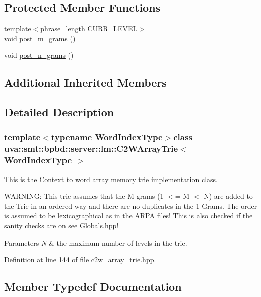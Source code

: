 \subsection*{Protected Member Functions}
\begin{DoxyCompactItemize}
\item 
{\footnotesize template$<$phrase\+\_\+length C\+U\+R\+R\+\_\+\+L\+E\+V\+E\+L$>$ }\\void \hyperlink{classuva_1_1smt_1_1bpbd_1_1server_1_1lm_1_1_c2_w_array_trie_aa7dc7f75fd6a0b6ffbc3cfdd0fdc7442}{post\+\_\+m\+\_\+grams} ()
\item 
void \hyperlink{classuva_1_1smt_1_1bpbd_1_1server_1_1lm_1_1_c2_w_array_trie_a6d979b826c4a6f9f238027be81a67b64}{post\+\_\+n\+\_\+grams} ()
\end{DoxyCompactItemize}
\subsection*{Additional Inherited Members}


\subsection{Detailed Description}
\subsubsection*{template$<$typename Word\+Index\+Type$>$class uva\+::smt\+::bpbd\+::server\+::lm\+::\+C2\+W\+Array\+Trie$<$ Word\+Index\+Type $>$}

This is the Context to word array memory trie implementation class.

W\+A\+R\+N\+I\+N\+G\+: This trie assumes that the M-\/grams (1 $<$= M $<$ N) are added to the Trie in an ordered way and there are no duplicates in the 1-\/\+Grams. The order is assumed to be lexicographical as in the A\+R\+P\+A files! This is also checked if the sanity checks are on see Globals.\+hpp!


\begin{DoxyParams}{Parameters}
{\em N} & the maximum number of levels in the trie. \\
\hline
\end{DoxyParams}


Definition at line 144 of file c2w\+\_\+array\+\_\+trie.\+hpp.



\subsection{Member Typedef Documentation}
\hypertarget{classuva_1_1smt_1_1bpbd_1_1server_1_1lm_1_1_c2_w_array_trie_a41928028d8a20a85548496b5e0ce3759}{}
